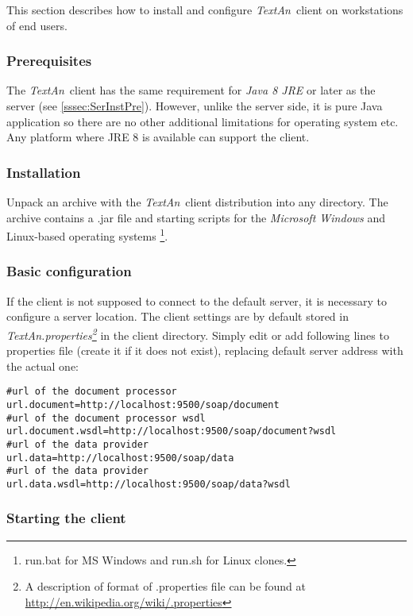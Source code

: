\documentclass[12pt,a4paper]{report}
\newcommand{\textan}{\emph{TextAn}}
\begin{document}
This section describes how to install and configure \textan\ client on workstations of end users.

\subsubsection{Prerequisites}

The \textan\ client has the same requirement for \emph{Java 8 JRE} or later as the server (see \ref{sssec:SerInstPre}).
However, unlike the server side, it is pure Java application so there are no other additional limitations for operating system etc.
Any platform where JRE 8 is available can support the client.

\subsubsection{Installation}

Unpack an archive with the \textan\ client distribution into any directory. 
The archive contains a .jar file and starting scripts for the \emph{Microsoft Windows} and Linux-based operating systems
\footnote{run.bat for MS Windows and run.sh for Linux clones.\label{runscript_note}}.

\subsubsection{Basic configuration}

If the client is not supposed to connect to the default server, it is necessary to configure a server location. 
The client settings are by default stored in \emph{TextAn.properties\footnote{A description of format of .properties file can be found at \url{http://en.wikipedia.org/wiki/.properties}}}
in the client directory. 
Simply edit or add following lines to properties file (create it if it does not exist),
replacing default server address with the actual one:
\begin{lstlisting}[frame=single,language=properties]
#url of the document processor
url.document=http://localhost:9500/soap/document
#url of the document processor wsdl
url.document.wsdl=http://localhost:9500/soap/document?wsdl
#url of the data provider
url.data=http://localhost:9500/soap/data
#url of the data provider
url.data.wsdl=http://localhost:9500/soap/data?wsdl
\end{lstlisting}

\subsubsection{Starting the client}
\end{document}
